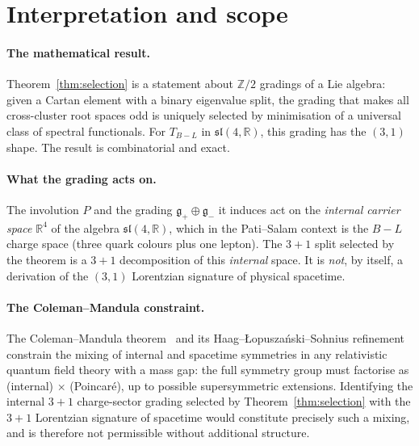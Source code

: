 \documentclass[11pt]{article}
\theoremstyle{plain}
\theoremstyle{definition}
\theoremstyle{remark}
\newcommand{\sln}[1]{\mathfrak{sl}(#1,\mathbb{R})}
\newcommand{\TBL}{T_{B\!-\!L}}
\begin{document}
\section{Interpretation and scope}

\paragraph{The mathematical result.}
Theorem~\ref{thm:selection} is a statement about $\mathbb{Z}/2$
gradings of a Lie algebra: given a Cartan element with a binary
eigenvalue split, the grading that makes all cross-cluster root
spaces odd is uniquely selected by minimisation of a universal
class of spectral functionals.  For $\TBL$ in $\sln{4}$, this
grading has the $(3,1)$ shape.  The result is combinatorial and
exact.

\paragraph{What the grading acts on.}
The involution $P$ and the grading $\mathfrak{g}_+ \oplus
\mathfrak{g}_-$ it induces act on the \emph{internal carrier
space} $\mathbb{R}^4$ of the algebra $\sln{4}$, which in the
Pati--Salam context is the $B{-}L$ charge space (three quark
colours plus one lepton).  The $3{+}1$ split selected by the
theorem is a $3{+}1$ decomposition of this \emph{internal} space.
It is \emph{not}, by itself, a derivation of the $(3,1)$ Lorentzian
signature of physical spacetime.

\paragraph{The Coleman--Mandula constraint.}
The Coleman--Mandula theorem~\cite{ColemanMandula1967} and its
Haag--{\L}opusza\'{n}ski--Sohnius
refinement~\cite{HaagLopuszanskiSohnius1975} constrain the mixing
of internal and spacetime symmetries in any relativistic quantum
field theory with a mass gap: the full symmetry group must
factorise as (internal) $\times$ (Poincar\'{e}), up to possible
supersymmetric extensions.  Identifying the internal $3{+}1$
charge-sector grading selected by Theorem~\ref{thm:selection} with
the $3{+}1$ Lorentzian signature of spacetime would constitute
precisely such a mixing, and is therefore not permissible without
additional structure.
\end{document}

